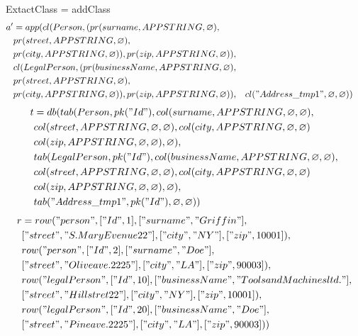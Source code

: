 \documentclass[11pt]{article}
\begin{document}
ExtactClass = addClass
\hline
\begin{align*}
a' &= app(cl(Person, (pr(surname, APPSTRING, \varnothing), \\
& pr(street, APPSTRING, \varnothing), \\
& pr(city, APPSTRING, \varnothing)), pr(zip, APPSTRING, \varnothing)), \\
& cl(LegalPerson, (pr(businessName, APPSTRING, \varnothing), \\
& pr(street, APPSTRING, \varnothing), \\
& pr(city, APPSTRING, \varnothing)), pr(zip, APPSTRING, \varnothing)),
& cl("Address\_tmp1", \varnothing, \varnothing)
& )
\end{align*}
\begin{align*}
t &= db(tab(Person, pk("Id"), col(surname, APPSTRING, \varnothing, \varnothing), \\
& col(street, APPSTRING, \varnothing, \varnothing), col(city, APPSTRING, \varnothing, \varnothing) \\
& col(zip, APPSTRING, \varnothing, \varnothing), \varnothing), \\
& tab(LegalPerson, pk("Id"),  col(businessName, APPSTRING, \varnothing, \varnothing), \\
& col(street, APPSTRING, \varnothing, \varnothing), col(city, APPSTRING, \varnothing, \varnothing) \\
& col(zip, APPSTRING, \varnothing, \varnothing), \varnothing), \\
& tab("Address\_tmp1", pk("Id"), \varnothing, \varnothing)) 
\end{align*}
\begin{align*}
r &= row("person", ["Id", 1], ["surname", "Griffin"], \\
& ["street", "S. Mary Evenue 22"], ["city", "NY"], ["zip", 10001]), \\
& row("person", ["Id", 2], ["surname", "Doe"], \\
& ["street", "Olive ave. 2225"], ["city", "LA"], ["zip", 90003]), \\
& row("legalPerson", ["Id", 10], ["businessName", "Tools and Machines ltd."], \\
& ["street", "Hill stret 22"], ["city", "NY"], ["zip", 10001]), \\
& row("legalPerson", ["Id", 20], ["businessName", "Doe"], \\
& ["street", "Pine ave. 2225"], ["city", "LA"], ["zip", 90003]))
\end{align*}
\end{document}
